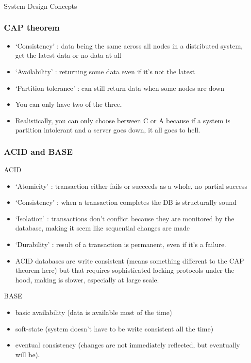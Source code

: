 \begin{frame}[fragile]\frametitle{}
\begin{center}
{\Large System Design Concepts}
\end{center}

\end{frame}

\begin{frame}
	\frametitle{CAP theorem}
		
			\begin{itemize}
				\item  `Consistency' : data being the same across all nodes in a distributed system, get the latest data or no data at all
				\item `Availability' : returning some data even if it’s not the latest
				\item `Partition tolerance' : can still return data when some nodes are down
				\item You can only have two of the three. 
				\item Realistically, you can only choose between C or A because if a system is partition intolerant and a server goes down, it all goes to hell. 
			\end{itemize}
\end{frame}

\begin{frame}
	\frametitle{ACID and BASE}
		ACID
			\begin{itemize}
				\item `Atomicity' : transaction either fails or succeeds as a whole, no partial success
				\item `Consistency' : when a transaction completes the DB is structurally sound
				\item `Isolation' : transactions don’t conflict because they are monitored by the database, making it seem like sequential changes are made
				\item `Durability' : result of a transaction is permanent, even if it’s a failure. 
				\item ACID databases are write consistent (means something different to the CAP 
theorem here) but that requires sophisticated locking protocols under the hood, making is slower, 
especially at large scale. 
			\end{itemize}
		BASE
			\begin{itemize}
				\item basic availability (data is available most of the time)
				\item soft-state (system doesn’t have to be write consistent all the time)
				\item eventual consistency (changes are not immediately reflected, but 
eventually will be). 
			\end{itemize}		
\end{frame}

